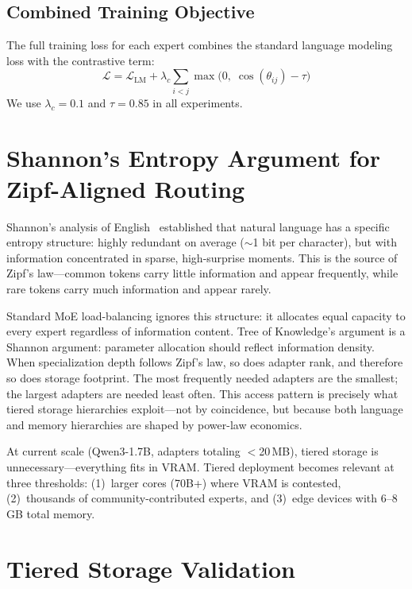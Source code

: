 \documentclass{article}
\newcommand{\tok}{Tree of Knowledge}
\begin{document}
\subsection{Combined Training Objective}

The full training loss for each expert combines the standard language modeling
loss with the contrastive term:
\begin{equation}
    \mathcal{L} = \mathcal{L}_{\text{LM}} + \lambda_c \sum_{i < j} \max\bigl(0,\; \cos(\theta_{ij}) - \tau\bigr)
\end{equation}
We use $\lambda_c = 0.1$ and $\tau = 0.85$ in all experiments.

\section{Shannon's Entropy Argument for Zipf-Aligned Routing}
\label{app:shannon}

Shannon's analysis of English~\cite{shannon1948} established that natural
language has a specific entropy structure: highly redundant on average
($\sim$1 bit per character), but with information concentrated in sparse,
high-surprise moments. This is the source of Zipf's law---common tokens carry
little information and appear frequently, while rare tokens carry much
information and appear rarely.

Standard MoE load-balancing ignores this structure: it allocates equal capacity
to every expert regardless of information content. \tok{}'s argument is a
Shannon argument: parameter allocation should reflect information density. When
specialization depth follows Zipf's law, so does adapter rank, and therefore so
does storage footprint. The most frequently needed adapters are the smallest;
the largest adapters are needed least often. This access pattern is precisely
what tiered storage hierarchies exploit---not by coincidence, but because both
language and memory hierarchies are shaped by power-law economics.

At current scale (Qwen3-1.7B, adapters totaling $<$20\,MB), tiered storage is
unnecessary---everything fits in VRAM. Tiered deployment becomes relevant at
three thresholds: (1)~larger cores (70B+) where VRAM is contested,
(2)~thousands of community-contributed experts, and (3)~edge devices with
6--8\,GB total memory.

\section{Tiered Storage Validation}
\label{app:tiered}
\end{document}
